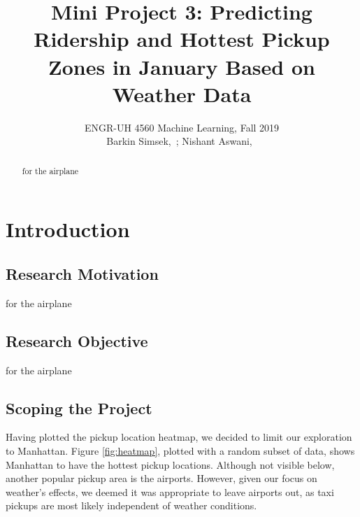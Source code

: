 \documentclass[journal]{IEEEtran}
\begin{document}
{}
\setcounter{page}{1}

\title{{\large Mini Project 3: Predicting Ridership and Hottest Pickup Zones in January Based on Weather Data}}

\author{ENGR-UH 4560 Machine Learning, Fall 2019\\
\medskip
Barkin Simsek,~;
Nishant Aswani,~}%


%
{}

\maketitle

\begin{abstract}
for the airplane
\end{abstract}

\section{Introduction}
\subsection{Research Motivation}
{\color{blue} for the airplane}

\subsection{Research Objective}
{\color{blue} for the airplane}

\subsection{Scoping the Project}
\noindent Having plotted the pickup location heatmap, we decided to limit our exploration to Manhattan. Figure \ref{fig:heatmap}, plotted with a random subset of data, shows Manhattan to have the hottest pickup locations. Although not visible below, another popular pickup area is the airports. However, given our focus on weather's effects, we deemed it was appropriate to leave airports out, as taxi pickups are most likely independent of weather conditions.\\
\end{document}

